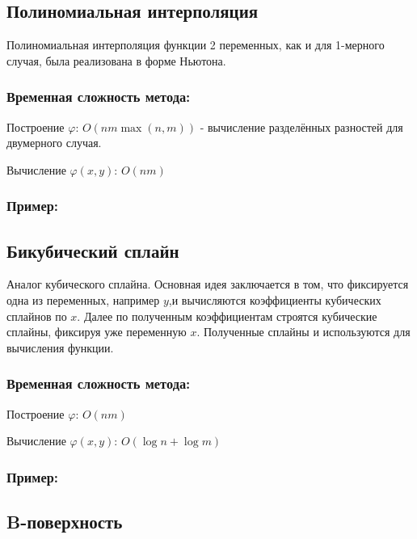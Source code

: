 

\subsection{Полиномиальная интерполяция}

Полиномиальная интерполяция функции 2 переменных, как и для 1-мерного случая, была реализована в форме Ньютона.

\subsubsection{Временная сложность метода:}

Построение $\varphi$: $O(n m \max(n, m))$ - вычисление разделённых разностей для двумерного случая.

Вычисление $\varphi(x, y)$: $O(n m)$

\subsubsection{Пример:}



\subsection{Бикубический сплайн}

Аналог кубического сплайна. Основная идея заключается в том, что фиксируется одна из переменных, например $y$,и вычисляются коэффициенты кубических сплайнов по $x$. Далее по полученным коэффициентам строятся кубические сплайны, фиксируя уже переменную $x$. Полученные сплайны и используются для вычисления функции.

\subsubsection{Временная сложность метода:}

Построение $\varphi$: $O(n m)$

Вычисление $\varphi(x, y)$: $O(\log{n} + \log{m})$

\subsubsection{Пример:}



\subsection{B-поверхность}

